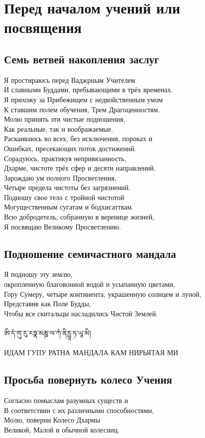 \section{Перед началом учений или посвящения}

\subsection{Семь ветвей накопления заслуг}

Я простираюсь перед Ваджрным Учителем\\
И славными Буддами, пребывающими в трёх временах.\\
Я прихожу за Прибежищем с недвойственным умом\\
К ставшим полем обучения, Трем Драгоценностям.\\
Молю принять эти чистые подношения,\\
Как реальные, так и воображаемые.\\
Раскаиваюсь во всех, без исключения, пороках и\\
Ошибках, пресекающих поток достижений.\\
Сорадуюсь, практикуя непривязанность,\\
Дхарме, чистоте трёх сфер и десяти направлений.\\
Зарождаю ум полного Просветления,\\
Четыре предела чистоты без загрязнений.\\
Подношу свое тело с тройной чистотой\\
Могущественным сугатам и бодхисаттвам.\\
Всю добродетель, собранную в веренице жизней,\\
Я посвящаю Великому Просветлению.
\newpage

\subsection{Подношение семичастного мандала}

Я подношу эту землю, \\
\indent окропленную благовонной водой и усыпанную цветами,\\
Гору Сумеру, четыре континента, украшенную солнцем и луной,\\
Представив как Поле Будды,\\
Чтобы все скитальцы насладились Чистой Землей.\\
\\
\ti
ཨི་དཾ་གུ་རུ་རཏྣ་མཎྜ་ལ་ཀཾ་ནིརྻཱ་ཏ་ཡཱ་མི།\\
\\
\ru ИДАМ ГУПУ РАТНА МАНДАЛА КАМ НИРЬЯТАЯ МИ

\subsection{Просьба повернуть колесо Учения}

Согласно помыслам разумных существ и\\
В соответствии с их различными способностями,\\
Молю, поверни Колесо Дхармы\\
Великой, Малой и обычной колесниц.